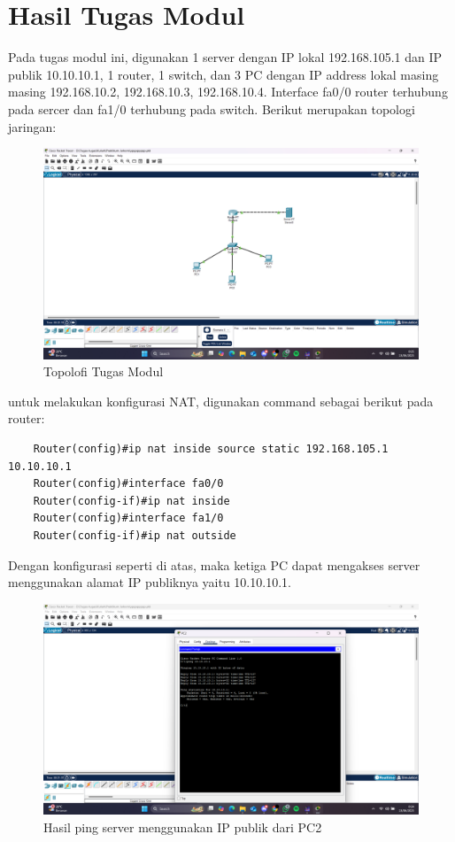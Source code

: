 \section{Hasil Tugas Modul}
Pada tugas modul ini, digunakan 1 server dengan IP lokal 192.168.105.1 dan IP publik 10.10.10.1, 1 router, 1 switch, dan 3 PC dengan IP address lokal masing masing 192.168.10.2, 192.168.10.3, 192.168.10.4. Interface fa0/0 router terhubung pada sercer dan fa1/0 terhubung pada switch. Berikut merupakan topologi jaringan:
\begin{figure}[H]
	\centering
	\includegraphics[width=\linewidth]{P4/img/tumod (6).png}
	\caption{Topolofi Tugas Modul}
	\hspace{1cm}
\end{figure}
untuk melakukan konfigurasi NAT, digunakan command sebagai berikut pada router:
\begin{lstlisting}
	Router(config)#ip nat inside source static 192.168.105.1 10.10.10.1
	Router(config)#interface fa0/0
	Router(config-if)#ip nat inside
	Router(config)#interface fa1/0
	Router(config-if)#ip nat outside
\end{lstlisting}
Dengan konfigurasi seperti di atas, maka ketiga PC dapat mengakses server menggunakan alamat IP publiknya yaitu 10.10.10.1.
\begin{figure}[H]
	\centering
	\includegraphics[width=\linewidth]{P4/img/tumod (4).png}
	\caption{Hasil ping server menggunakan IP publik dari PC2}
	\hspace{1cm}
\end{figure}
